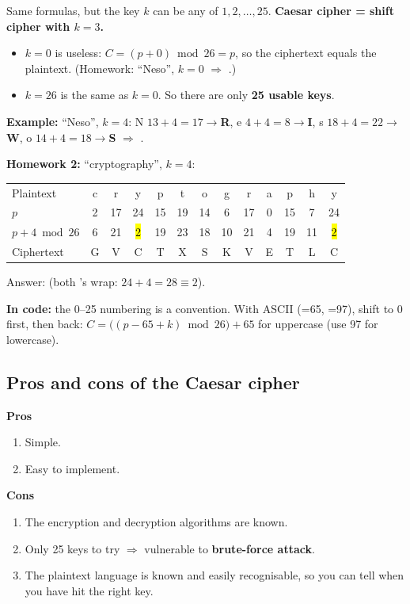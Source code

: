 \begin{keybox}
Same formulas, but the key $k$ can be any of $1,2,\dots,25$. \textbf{Caesar cipher = shift cipher with $k=3$.}
\end{keybox}
\begin{itemize}
  \item $k=0$ is useless: $C = (p+0) \bmod 26 = p$, so the ciphertext equals the plaintext. (Homework: ``Neso'', $k=0$ $\Rightarrow$ .)
  \item $k=26$ is the same as $k=0$. So there are only \textbf{25 usable keys}.
\end{itemize}

\textbf{Example:} ``Neso'', $k=4$: \;
N $13{+}4{=}17\to$\textbf{R},\;
e $4{+}4{=}8\to$\textbf{I},\;
s $18{+}4{=}22\to$\textbf{W},\;
o $14{+}4{=}18\to$\textbf{S} \;$\Rightarrow$\; \textbf{}.

\textbf{Homework 2:} ``cryptography'', $k=4$:
\begin{center}\small\setlength{\tabcolsep}{4.5pt}
\begin{tabular}{@{}l*{12}{c}@{}}
\toprule
Plaintext & c&r&y&p&t&o&g&r&a&p&h&y\\
$p$ & 2&17&24&15&19&14&6&17&0&15&7&24\\
$p+4 \bmod 26$ & 6&21&\hl{2}&19&23&18&10&21&4&19&11&\hl{2}\\
Ciphertext & G&V&C&T&X&S&K&V&E&T&L&C\\
\bottomrule
\end{tabular}
\end{center}
Answer: \textbf{} (both 's wrap: $24+4=28 \equiv 2$).

\textbf{In code:} the 0--25 numbering is a convention. With ASCII (=65, =97), shift to 0 first, then back:
\;$C = \big((p - 65 + k) \bmod 26\big) + 65$ for uppercase (use 97 for lowercase).

\subsection{Pros and cons of the Caesar cipher}
\begin{minipage}[t]{0.3\textwidth}
\textbf{Pros}
\begin{enumerate}[leftmargin=1.5em]
  \item Simple.
  \item Easy to implement.
\end{enumerate}
\end{minipage}\hfill
\begin{minipage}[t]{0.66\textwidth}
\textbf{Cons}
\begin{enumerate}[leftmargin=1.5em]
  \item The encryption and decryption algorithms are known.
  \item Only 25 keys to try $\Rightarrow$ vulnerable to \textbf{brute-force attack}.
  \item The plaintext language is known and easily recognisable, so you can tell when you have hit the right key.
\end{enumerate}
\end{minipage}

